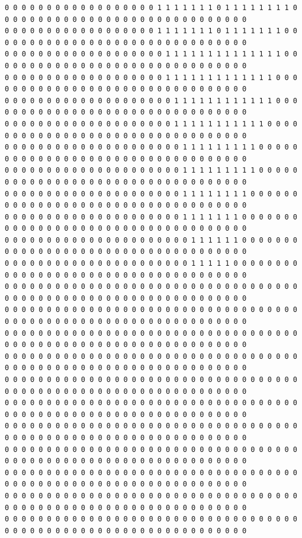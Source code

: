 \documentclass{oci}
\begin{document}
\begin{sampleDescription}
{\begin{verbatim}
0 0 0 0 0 0 0 0 0 0 0 0 0 0 0 0 0 0 1 1 1 1 1 1 1 0 1 1 1 1 1 1 1 1 0 0 0 0 0 0 0 0 0 0 0 0 0 0 0 0 0 0 0 0 0 0 0 0 0 0 0 0 0 0
0 0 0 0 0 0 0 0 0 0 0 0 0 0 0 0 0 0 1 1 1 1 1 1 1 0 1 1 1 1 1 1 1 0 0 0 0 0 0 0 0 0 0 0 0 0 0 0 0 0 0 0 0 0 0 0 0 0 0 0 0 0 0 0
0 0 0 0 0 0 0 0 0 0 0 0 0 0 0 0 0 0 0 1 1 1 1 1 1 1 1 1 1 1 1 1 1 0 0 0 0 0 0 0 0 0 0 0 0 0 0 0 0 0 0 0 0 0 0 0 0 0 0 0 0 0 0 0
0 0 0 0 0 0 0 0 0 0 0 0 0 0 0 0 0 0 0 1 1 1 1 1 1 1 1 1 1 1 1 1 0 0 0 0 0 0 0 0 0 0 0 0 0 0 0 0 0 0 0 0 0 0 0 0 0 0 0 0 0 0 0 0
0 0 0 0 0 0 0 0 0 0 0 0 0 0 0 0 0 0 0 0 1 1 1 1 1 1 1 1 1 1 1 1 0 0 0 0 0 0 0 0 0 0 0 0 0 0 0 0 0 0 0 0 0 0 0 0 0 0 0 0 0 0 0 0
0 0 0 0 0 0 0 0 0 0 0 0 0 0 0 0 0 0 0 0 1 1 1 1 1 1 1 1 1 1 1 0 0 0 0 0 0 0 0 0 0 0 0 0 0 0 0 0 0 0 0 0 0 0 0 0 0 0 0 0 0 0 0 0
0 0 0 0 0 0 0 0 0 0 0 0 0 0 0 0 0 0 0 0 0 1 1 1 1 1 1 1 1 1 0 0 0 0 0 0 0 0 0 0 0 0 0 0 0 0 0 0 0 0 0 0 0 0 0 0 0 0 0 0 0 0 0 0
0 0 0 0 0 0 0 0 0 0 0 0 0 0 0 0 0 0 0 0 0 1 1 1 1 1 1 1 1 1 0 0 0 0 0 0 0 0 0 0 0 0 0 0 0 0 0 0 0 0 0 0 0 0 0 0 0 0 0 0 0 0 0 0
0 0 0 0 0 0 0 0 0 0 0 0 0 0 0 0 0 0 0 0 0 1 1 1 1 1 1 1 1 0 0 0 0 0 0 0 0 0 0 0 0 0 0 0 0 0 0 0 0 0 0 0 0 0 0 0 0 0 0 0 0 0 0 0
0 0 0 0 0 0 0 0 0 0 0 0 0 0 0 0 0 0 0 0 0 1 1 1 1 1 1 1 0 0 0 0 0 0 0 0 0 0 0 0 0 0 0 0 0 0 0 0 0 0 0 0 0 0 0 0 0 0 0 0 0 0 0 0
0 0 0 0 0 0 0 0 0 0 0 0 0 0 0 0 0 0 0 0 0 0 1 1 1 1 1 1 0 0 0 0 0 0 0 0 0 0 0 0 0 0 0 0 0 0 0 0 0 0 0 0 0 0 0 0 0 0 0 0 0 0 0 0
0 0 0 0 0 0 0 0 0 0 0 0 0 0 0 0 0 0 0 0 0 0 1 1 1 1 1 0 0 0 0 0 0 0 0 0 0 0 0 0 0 0 0 0 0 0 0 0 0 0 0 0 0 0 0 0 0 0 0 0 0 0 0 0
0 0 0 0 0 0 0 0 0 0 0 0 0 0 0 0 0 0 0 0 0 0 0 0 0 0 0 0 0 0 0 0 0 0 0 0 0 0 0 0 0 0 0 0 0 0 0 0 0 0 0 0 0 0 0 0 0 0 0 0 0 0 0 0
0 0 0 0 0 0 0 0 0 0 0 0 0 0 0 0 0 0 0 0 0 0 0 0 0 0 0 0 0 0 0 0 0 0 0 0 0 0 0 0 0 0 0 0 0 0 0 0 0 0 0 0 0 0 0 0 0 0 0 0 0 0 0 0
0 0 0 0 0 0 0 0 0 0 0 0 0 0 0 0 0 0 0 0 0 0 0 0 0 0 0 0 0 0 0 0 0 0 0 0 0 0 0 0 0 0 0 0 0 0 0 0 0 0 0 0 0 0 0 0 0 0 0 0 0 0 0 0
0 0 0 0 0 0 0 0 0 0 0 0 0 0 0 0 0 0 0 0 0 0 0 0 0 0 0 0 0 0 0 0 0 0 0 0 0 0 0 0 0 0 0 0 0 0 0 0 0 0 0 0 0 0 0 0 0 0 0 0 0 0 0 0
0 0 0 0 0 0 0 0 0 0 0 0 0 0 0 0 0 0 0 0 0 0 0 0 0 0 0 0 0 0 0 0 0 0 0 0 0 0 0 0 0 0 0 0 0 0 0 0 0 0 0 0 0 0 0 0 0 0 0 0 0 0 0 0
0 0 0 0 0 0 0 0 0 0 0 0 0 0 0 0 0 0 0 0 0 0 0 0 0 0 0 0 0 0 0 0 0 0 0 0 0 0 0 0 0 0 0 0 0 0 0 0 0 0 0 0 0 0 0 0 0 0 0 0 0 0 0 0
0 0 0 0 0 0 0 0 0 0 0 0 0 0 0 0 0 0 0 0 0 0 0 0 0 0 0 0 0 0 0 0 0 0 0 0 0 0 0 0 0 0 0 0 0 0 0 0 0 0 0 0 0 0 0 0 0 0 0 0 0 0 0 0
0 0 0 0 0 0 0 0 0 0 0 0 0 0 0 0 0 0 0 0 0 0 0 0 0 0 0 0 0 0 0 0 0 0 0 0 0 0 0 0 0 0 0 0 0 0 0 0 0 0 0 0 0 0 0 0 0 0 0 0 0 0 0 0
0 0 0 0 0 0 0 0 0 0 0 0 0 0 0 0 0 0 0 0 0 0 0 0 0 0 0 0 0 0 0 0 0 0 0 0 0 0 0 0 0 0 0 0 0 0 0 0 0 0 0 0 0 0 0 0 0 0 0 0 0 0 0 0
0 0 0 0 0 0 0 0 0 0 0 0 0 0 0 0 0 0 0 0 0 0 0 0 0 0 0 0 0 0 0 0 0 0 0 0 0 0 0 0 0 0 0 0 0 0 0 0 0 0 0 0 0 0 0 0 0 0 0 0 0 0 0 0
0 0 0 0 0 0 0 0 0 0 0 0 0 0 0 0 0 0 0 0 0 0 0 0 0 0 0 0 0 0 0 0 0 0 0 0 0 0 0 0 0 0 0 0 0 0 0 0 0 0 0 0 0 0 0 0 0 0 0 0 0 0 0 0
\end{verbatim}
}


\end{sampleDescription}
\end{document}
